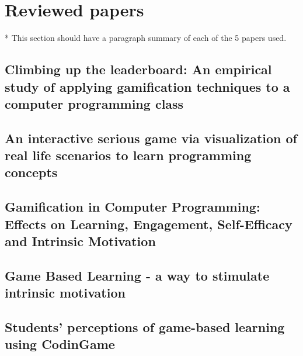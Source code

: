 \section{Reviewed papers}
* This section should have a paragraph summary of each of the 5 papers used. 

\subsection{Climbing up the leaderboard: An empirical study of applying gamification techniques to a computer programming class}
\cite{panagiotis2016climbing}

\subsection{An interactive serious game via visualization of real life scenarios to learn programming concepts}
\cite{sajana2015interactive}

\subsection{Gamification in Computer Programming: Effects on Learning, Engagement, Self-Efficacy and Intrinsic Motivation}
\cite{ortiz2017gamification}

\subsection{Game Based Learning - a way to stimulate intrinsic motivation} \cite{mozelius2014game}

\subsection{Students' perceptions of game-based learning using CodinGame}
\cite{butt2016}
